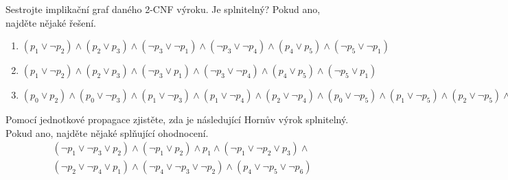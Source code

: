 \documentclass[a4paper,12pt]{article}
\begin{document}
    
\medskip\begin{problem} Sestrojte implikační graf daného 2-CNF výroku. Je splnitelný? Pokud ano, najděte nějaké řešení.
\begin{enumerate}
    \item $(p_1\vee \neg p_2)\wedge (p_2\vee p_3)\wedge (\neg p_3\vee \neg p_1)\wedge (\neg p_3\vee \neg p_4)\wedge (p_4\vee p_5)\wedge (\neg p_5\vee \neg p_1)$
    \item $(p_1\vee \neg p_2)\wedge (p_2\vee p_3)\wedge (\neg p_3\vee p_1)\wedge (\neg p_3\vee \neg p_4)\wedge (p_4\vee p_5)\wedge (\neg p_5\vee p_1)$
    \item $(p_0 \vee  p_2) \wedge  (p_0 \vee  \neg p_3) \wedge  (p_1 \vee  \neg p_3) 
    \wedge  (p_1 \vee  \neg p_4) \wedge  (p_2 \vee  \neg p_4) 
    \wedge  (p_0 \vee  \neg p_5)
    \wedge 
    (p_1 \vee  \neg p_5) \wedge  (p_2 \vee  \neg p_5) \wedge  (\neg p_1 \vee  \neg p_6) \wedge  (p_4 \vee  p_6) \wedge  (p_5 \vee  p_6) \wedge  p_1\wedge \neg p_7$
\end{enumerate}
\end{problem}


\medskip\begin{problem}
Pomocí jednotkové propagace zjistěte, zda je následující Hornův výrok splnitelný. Pokud ano, najděte nějaké splňující ohodnocení.
\begin{align*}
    &(\neg p_1 \vee \neg p_3 \vee p_2)\wedge(\neg p_1 \vee p_2)\wedge p_1 \wedge (\neg p_1 \vee \neg p_2 \vee p_3)\wedge \\
    &(\neg p_2 \vee \neg p_4 \vee p_1)\wedge(\neg p_4 \vee \neg p_3 \vee \neg p_2)\wedge(p_4\vee \neg p_5 \vee\neg p_6)
\end{align*}
\end{problem}
    
\end{document}
